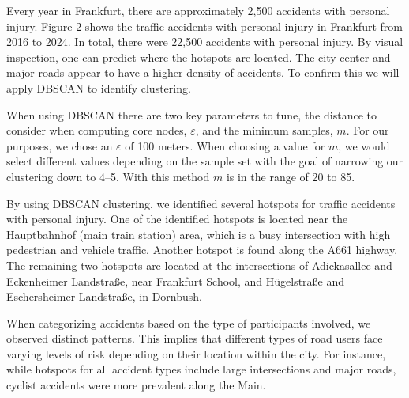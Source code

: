 \documentclass[10pt,a4paper]{article} %
\begin{document}
Every year in Frankfurt, there are approximately 2,500 accidents with personal injury. Figure 2 shows the traffic accidents with personal injury in Frankfurt from 2016 to 2024. In total, there were 22,500 accidents with personal injury. By visual inspection, one can predict where the hotspots are located. The city center and major roads appear to have a higher density of accidents. To confirm this we will apply DBSCAN to identify clustering.\\
\par
When using DBSCAN there are two key parameters to tune, the distance to consider when computing core nodes, \(\varepsilon{}\), and the minimum samples, \(m\). For our purposes, we chose an \(\varepsilon{}\) of 100 meters. When choosing a value for \(m\), we would select different values depending on the sample set with the goal of narrowing our clustering down to 4--5. With this method \(m\) is in the range of 20 to 85.\\
\par
By using DBSCAN clustering, we identified several hotspots for traffic accidents with personal injury. One of the identified hotspots is located near the Hauptbahnhof (main train station) area, which is a busy intersection with high pedestrian and vehicle traffic. Another hotspot is found along the A661 highway. The remaining two hotspots are located at the intersections of Adickasallee and Eckenheimer Landstraße, near Frankfurt School, and Hügelstraße and Eschersheimer Landstraße, in Dornbush.\\
\par
When categorizing accidents based on the type of participants involved, we observed distinct patterns. This implies that different types of road users face varying levels of risk depending on their location within the city. For instance, while hotspots for all accident types include large intersections and major roads, cyclist accidents were more prevalent along the Main.\\
\end{document}
